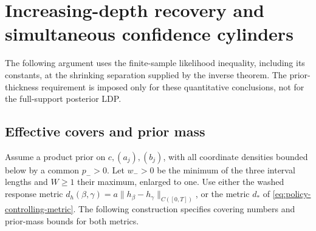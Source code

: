 \section{Increasing-depth recovery and simultaneous confidence cylinders}
\label{sec:growing-depth}
The following argument uses the finite-sample likelihood inequality, including
its constants, at the shrinking separation supplied by the inverse theorem.
The prior-thickness requirement is imposed only for these quantitative
conclusions, not for the full-support posterior LDP.

\subsection{Effective covers and prior mass}
Assume a product prior on \(c,(a_j),(b_j)\), with all coordinate densities
bounded below by a common \(p_->0\). Let \(w_->0\) be the minimum of the
three interval lengths and \(W\ge1\) their maximum, enlarged to one.
Use either the washed response metric
\(d_h(\beta,\gamma)=a\|h_\beta-h_\gamma\|_{C([0,T])}\), or the metric
\(d_*\) of \eqref{eq:policy-controlling-metric}. The following construction specifies
covering numbers and prior-mass bounds for both metrics.

